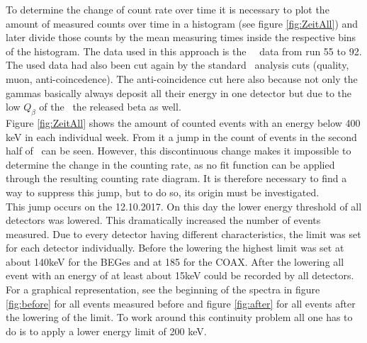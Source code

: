 \documentclass[encoding=utf8,british]{tumphthesis}
\begin{document}
To determine the change of count rate over time it is necessary to plot the amount of measured counts over time in a histogram (see figure \ref{fig:ZeitAll}) and later divide those counts by the mean measuring times inside the respective bins of the histogram.
The data used in this approach is the \gerda\ \PII\ data from run 55 to 92.
The used data had also been cut again by the standard \gerda\ analysis cuts (quality, muon, anti-coincedence).
The anti-coincidence cut here also because not only the gammas basically always deposit all their energy in one detector but due to the low  $Q_\beta$ of the \Kr\ the released beta as well.
 \\

Figure \ref{fig:ZeitAll} shows the amount of counted events with an energy below 400 keV in each individual week.
From it a jump in the count of events in the second half of \PII\ can be seen.
However, this discontinuous change makes it impossible to determine the change in the counting rate, as no fit function can be applied through the resulting counting rate diagram. 
It is therefore necessary to find a way to suppress this jump, but to do so, its origin must be investigated.
\\

This jump occurs on the 12.10.2017.
On this day the lower energy threshold of all detectors was lowered.
This dramatically increased the number of events measured.
Due to every detector having different characteristics, the limit was set for each detector individually.
Before the lowering the highest limit was set at about 140keV for the BEGes and at 185 for the COAX.
After the lowering all event with an energy of at least about 15keV could be recorded by all detectors.
For a graphical representation, see the beginning of the spectra in figure \ref{fig:before} for all events measured before and figure \ref{fig:after} for all events after the lowering of the limit. 
To work around this continuity problem all one has to do is to apply a lower energy limit of 200 keV.
\\
\end{document}
